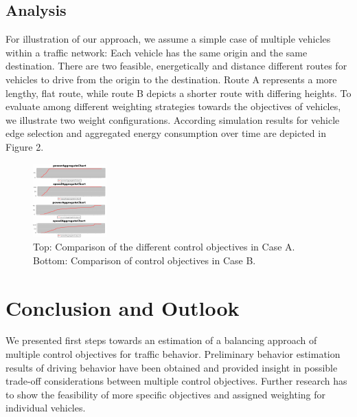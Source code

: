 \documentclass[conference]{../cls/IEEEtran}
\begin{document}
\subsection{Analysis}

For illustration of our approach, we assume a simple case of multiple vehicles
within a traffic network: Each vehicle has the same origin and the same
destination. There are two feasible, energetically and distance different
routes for vehicles to drive from the origin to the destination. Route A
represents a more lengthy, flat route, while route B depicts a shorter route
with differing heights. To evaluate among different weighting strategies towards
the objectives of vehicles, we illustrate two weight configurations.
According simulation results for vehicle edge selection and aggregated energy
consumption over time are depicted in Figure 2. 

\begin{figure}[t!]
	\includegraphics[width=\columnwidth]{../gfx/placeholder.pdf}
	\caption{Top: Comparison of the different control objectives in Case A. Bottom:
	Comparison of control objectives in Case B.}
	\label{figure:results}
\end{figure}


\section{Conclusion and Outlook}

We presented first steps towards an estimation of a balancing
approach of multiple control objectives for traffic behavior.
Preliminary behavior estimation results of driving behavior have been obtained and provided insight 
in possible trade-off considerations between multiple control objectives.
Further research has to show the feasibility of more specific objectives and
assigned weighting for individual vehicles. 



\end{document}
